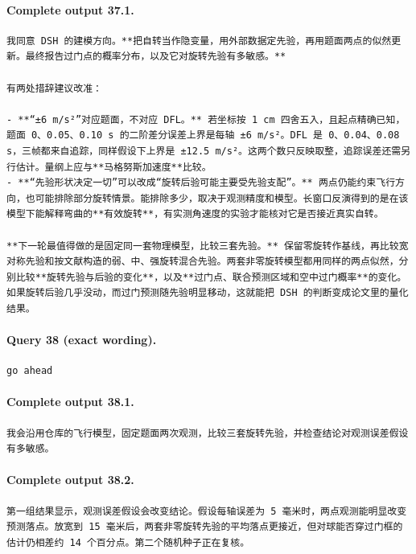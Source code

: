 \documentclass[UTF8,10pt]{ctexart}
\begin{document}
\paragraph{Complete output 37.1.}
\begin{Verbatim}[breaklines=true,breakanywhere=true,fontsize=\scriptsize,frame=single,framesep=2pt]
我同意 DSH 的建模方向。**把自转当作隐变量，用外部数据定先验，再用题面两点的似然更新。最终报告过门点的概率分布，以及它对旋转先验有多敏感。**

有两处措辞建议改准：

- **“±6 m/s²”对应题面，不对应 DFL。** 若坐标按 1 cm 四舍五入，且起点精确已知，题面 0、0.05、0.10 s 的二阶差分误差上界是每轴 ±6 m/s²。DFL 是 0、0.04、0.08 s，三帧都来自追踪，同样假设下上界是 ±12.5 m/s²。这两个数只反映取整，追踪误差还需另行估计。量纲上应与**马格努斯加速度**比较。
- **“先验形状决定一切”可以改成“旋转后验可能主要受先验支配”。** 两点仍能约束飞行方向，也可能排除部分旋转情景。能排除多少，取决于观测精度和模型。长窗口反演得到的是在该模型下能解释弯曲的**有效旋转**，有实测角速度的实验才能核对它是否接近真实自转。

**下一轮最值得做的是固定同一套物理模型，比较三套先验。** 保留零旋转作基线，再比较宽对称先验和按文献构造的弱、中、强旋转混合先验。两套非零旋转模型都用同样的两点似然，分别比较**旋转先验与后验的变化**，以及**过门点、联合预测区域和空中过门概率**的变化。如果旋转后验几乎没动，而过门预测随先验明显移动，这就能把 DSH 的判断变成论文里的量化结果。
\end{Verbatim}

\paragraph{Query 38 (exact wording).}
\begin{Verbatim}[breaklines=true,breakanywhere=true,fontsize=\scriptsize,frame=single,framesep=2pt]
go ahead
\end{Verbatim}

\paragraph{Complete output 38.1.}
\begin{Verbatim}[breaklines=true,breakanywhere=true,fontsize=\scriptsize,frame=single,framesep=2pt]
我会沿用仓库的飞行模型，固定题面两次观测，比较三套旋转先验，并检查结论对观测误差假设有多敏感。
\end{Verbatim}

\paragraph{Complete output 38.2.}
\begin{Verbatim}[breaklines=true,breakanywhere=true,fontsize=\scriptsize,frame=single,framesep=2pt]
第一组结果显示，观测误差假设会改变结论。假设每轴误差为 5 毫米时，两点观测能明显改变预测落点。放宽到 15 毫米后，两套非零旋转先验的平均落点更接近，但对球能否穿过门框的估计仍相差约 14 个百分点。第二个随机种子正在复核。
\end{Verbatim}
\end{document}
